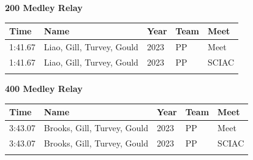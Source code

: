 \vspace{1.2em}
\noindent\begin{minipage}[t]{0.98\textwidth}
\centering
\textbf{\textcolor{teamprimary}{200 Medley Relay}}\par
\vspace{0.5em}
\centering
\small
\renewcommand{\arraystretch}{1.0}
\setlength{\tabcolsep}{4pt}
\begin{tabular}{@{}p{2.7cm}p{4.3cm}p{1.6cm}p{2.7cm}p{2.7cm}@{}}
\toprule
\textbf{Time} & \textbf{Name} & \textbf{Year} & \textbf{Team} & \textbf{Meet} \\
\midrule
1:41.67 & Liao, Gill, Turvey, Gould & 2023 & PP & Meet \\
1:41.67 & Liao, Gill, Turvey, Gould & 2023 & PP & SCIAC \\
\bottomrule
\vspace{0.5em}
\end{tabular}
\end{minipage}
\vspace{1.2em}
\noindent\begin{minipage}[t]{0.98\textwidth}
\centering
\textbf{\textcolor{teamprimary}{400 Medley Relay}}\par
\vspace{0.5em}
\centering
\small
\renewcommand{\arraystretch}{1.0}
\setlength{\tabcolsep}{4pt}
\begin{tabular}{@{}p{2.7cm}p{4.3cm}p{1.6cm}p{2.7cm}p{2.7cm}@{}}
\toprule
\textbf{Time} & \textbf{Name} & \textbf{Year} & \textbf{Team} & \textbf{Meet} \\
\midrule
3:43.07 & Brooks, Gill, Turvey, Gould & 2023 & PP & Meet \\
3:43.07 & Brooks, Gill, Turvey, Gould & 2023 & PP & SCIAC \\
\bottomrule
\vspace{0.5em}
\end{tabular}
\end{minipage}
\clearpage
